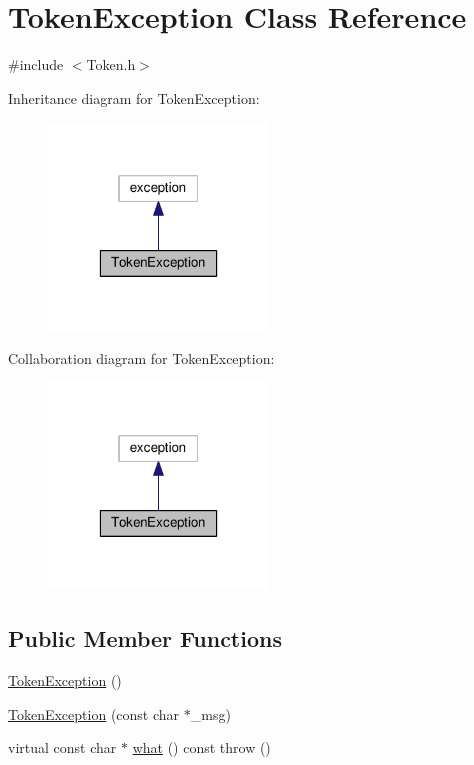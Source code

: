 \hypertarget{class_token_exception}{\section{Token\-Exception Class Reference}
\label{class_token_exception}
}


{\ttfamily \#include $<$Token.\-h$>$}



Inheritance diagram for Token\-Exception\-:\nopagebreak
\begin{figure}[H]
\begin{center}
\leavevmode
\includegraphics[width=166pt]{class_token_exception__inherit__graph}
\end{center}
\end{figure}


Collaboration diagram for Token\-Exception\-:\nopagebreak
\begin{figure}[H]
\begin{center}
\leavevmode
\includegraphics[width=166pt]{class_token_exception__coll__graph}
\end{center}
\end{figure}
\subsection*{Public Member Functions}
\begin{DoxyCompactItemize}
\item 
\hyperlink{class_token_exception_ace36519dfa1cf44875d33d2e3af8016b}{Token\-Exception} ()
\item 
\hyperlink{class_token_exception_a32cbe05a6ccaa1289912d570bb9b8497}{Token\-Exception} (const char $\ast$\-\_\-msg)
\item 
virtual const char $\ast$ \hyperlink{class_token_exception_a595cbd7a585aa6d1ec0c492e285b4897}{what} () const   throw ()
\end{DoxyCompactItemize}
